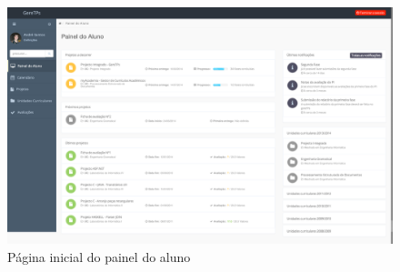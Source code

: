\begin{figure}[H]
  \centering
  \includegraphics[width=1\textwidth,center]{images/implementacao/alunos/dashboard}
  \caption{Página inicial do painel do aluno}
  \label{fig:student_dashboard}
\end{figure}
